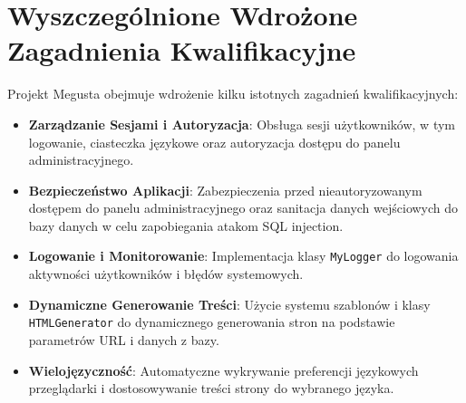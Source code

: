 \documentclass[a4paper,12pt]{report}
\begin{document}
\chapter{Wyszczególnione Wdrożone Zagadnienia Kwalifikacyjne}

Projekt Megusta obejmuje wdrożenie kilku istotnych zagadnień kwalifikacyjnych:
\begin{itemize}
    \item \textbf{Zarządzanie Sesjami i Autoryzacja}: Obsługa sesji użytkowników, w tym logowanie, ciasteczka językowe oraz autoryzacja dostępu do panelu administracyjnego.
    \item \textbf{Bezpieczeństwo Aplikacji}: Zabezpieczenia przed nieautoryzowanym dostępem do panelu administracyjnego oraz sanitacja danych wejściowych do bazy danych w celu zapobiegania atakom SQL injection.
    \item \textbf{Logowanie i Monitorowanie}: Implementacja klasy \texttt{MyLogger} do logowania aktywności użytkowników i błędów systemowych.
    \item \textbf{Dynamiczne Generowanie Treści}: Użycie systemu szablonów i klasy \texttt{HTMLGenerator} do dynamicznego generowania stron na podstawie parametrów URL i danych z bazy.
    \item \textbf{Wielojęzyczność}: Automatyczne wykrywanie preferencji językowych przeglądarki i dostosowywanie treści strony do wybranego języka.
\end{itemize}
\end{document}
